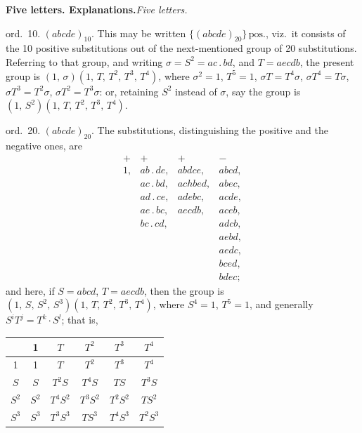 \documentclass[11pt]{article}
\begin{document}
\medskip
\noindent\textbf{Five letters. Explanations.}\hfill\textit{Five letters.}

\smallskip
\hspace{1em} ord.\ 10. $(abcde)_{10}$. This may be written
$\{(abcde)_{20}\}\,\text{pos.}$, viz.\ it consists of the 10 positive
substitutions out of the next-mentioned group of 20 substitutions.
Referring to that group, and writing $\sigma=S^{2}=ac\,.\,bd$, and
$T=aecdb$, the present group is $(1,\,\sigma)(1,\,T,\,T^{2},\,T^{3},\,T^{4})$,
where $\sigma^{2}=1$, $T^{5}=1$, $\sigma T=T^{4}\sigma$,
$\sigma T^{4}=T\sigma$, $\sigma T^{3}=T^{2}\sigma$,
$\sigma T^{2}=T^{3}\sigma$: or, retaining $S^{2}$ instead of $\sigma$, say
the group is $(1,\,S^{2})(1,\,T,\,T^{2},\,T^{3},\,T^{4})$.

\smallskip
\hspace{1em} ord.\ 20. $(abcde)_{20}$. The substitutions, distinguishing the
positive and the negative ones, are
\[
\begin{array}{cccc}
+ & + & + & -\\
1, & ab\,.\,de, & abdce, & abcd,\\
   & ac\,.\,bd, & achbed, & abec,\\
   & ad\,.\,ce, & adebc, & acde,\\
   & ae\,.\,bc, & aecdb, & aceb,\\
   & bc\,.\,cd, &        & adcb,\\
   &            &        & aebd,\\
   &            &        & aedc,\\
   &            &        & bced,\\
   &            &        & bdec;
\end{array}
\]
and here, if $S=abcd$, $T=aecdb$, then the group is
$(1,\,S,\,S^{2},\,S^{3})(1,\,T,\,T^{2},\,T^{3},\,T^{4})$, where $S^{4}=1$,
$T^{5}=1$, and generally $S^{i}T^{j}=T^{k}\cdot S^{l}$; that is,

\smallskip
\begin{center}
\renewcommand{\arraystretch}{1.2}
\begin{tabular}{|c|c|c|c|c|c|}
\hline
   & 1 & $T$ & $T^{2}$ & $T^{3}$ & $T^{4}$\\
\hline
1  & 1 & $T$ & $T^{2}$ & $T^{3}$ & $T^{4}$\\
\hline
$S$ & $S$ & $T^{2}S$ & $T^{4}S$ & $TS$ & $T^{3}S$\\
\hline
$S^{2}$ & $S^{2}$ & $T^{4}S^{2}$ & $T^{3}S^{2}$ & $T^{2}S^{2}$ & $TS^{2}$\\
\hline
$S^{3}$ & $S^{3}$ & $T^{3}S^{3}$ & $TS^{3}$ & $T^{4}S^{3}$ & $T^{2}S^{3}$\\
\hline
\end{tabular}
\end{center}
\end{document}
